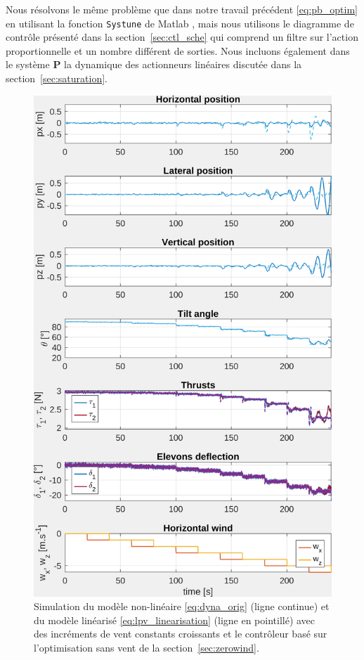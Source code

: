 Nous résolvons le même problème que dans notre travail précédent \ref{eq:pb_optim} en utilisant la fonction {\tt Systune} de Matlab \cite{1576856}, mais nous utilisons le diagramme de contrôle présenté dans la section~\ref{sec:ctl_sche} qui comprend un filtre sur l'action proportionnelle et un nombre différent de sorties. Nous incluons également dans le système $\boldsymbol{P}$ la dynamique des actionneurs linéaires discutée dans la section~\ref{sec:saturation}.
\begin{figure}[ht!]
    \centering
    \includegraphics[trim=0cm 0cm 0cm 0cm,clip,width=0.6\columnwidth]{figures/sim_systune_zero_wind.png}
    \caption{Simulation du modèle non-linéaire \eqref{eq:dyna_orig} (ligne continue) et du modèle linéarisé \eqref{eq:lpv_linearisation} (ligne en pointillé) avec des incréments de vent constants croissants et le contrôleur basé sur l'optimisation sans vent de la section~\ref{sec:zerowind}.}
    \label{fig:SimSytuneStruct_zero}
\end{figure}

